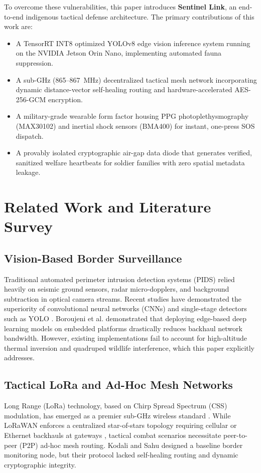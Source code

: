 \documentclass[conference]{IEEEtran}
\begin{document}
To overcome these vulnerabilities, this paper introduces \textbf{Sentinel Link}, an end-to-end indigenous tactical defense architecture. The primary contributions of this work are:
\begin{itemize}
    \item A TensorRT INT8 optimized YOLOv8 edge vision inference system running on the NVIDIA Jetson Orin Nano, implementing automated fauna suppression.
    \item A sub-GHz (865--867~MHz) decentralized tactical mesh network incorporating dynamic distance-vector self-healing routing and hardware-accelerated AES-256-GCM encryption.
    \item A military-grade wearable form factor housing PPG photoplethysmography (MAX30102) and inertial shock sensors (BMA400) for instant, one-press SOS dispatch.
    \item A provably isolated cryptographic air-gap data diode that generates verified, sanitized welfare heartbeats for soldier families with zero spatial metadata leakage.
\end{itemize}

\section{Related Work and Literature Survey}

\subsection{Vision-Based Border Surveillance}
Traditional automated perimeter intrusion detection systems (PIDS) relied heavily on seismic ground sensors, radar micro-dopplers, and background subtraction in optical camera streams. Recent studies have demonstrated the superiority of convolutional neural networks (CNNs) and single-stage detectors such as YOLO \cite{redmon2016yolo}. Boroujeni et al. \cite{boroujeni2021edge} demonstrated that deploying edge-based deep learning models on embedded platforms drastically reduces backhaul network bandwidth. However, existing implementations fail to account for high-altitude thermal inversion and quadruped wildlife interference, which this paper explicitly addresses.

\subsection{Tactical LoRa and Ad-Hoc Mesh Networks}
Long Range (LoRa) technology, based on Chirp Spread Spectrum (CSS) modulation, has emerged as a premier sub-GHz wireless standard \cite{augustin2016study, centenaro2016long}. While LoRaWAN enforces a centralized star-of-stars topology requiring cellular or Ethernet backhauls at gateways \cite{adelantado2017understanding}, tactical combat scenarios necessitate peer-to-peer (P2P) ad-hoc mesh routing. Kodali and Sahu \cite{kodali2019lora} designed a baseline border monitoring node, but their protocol lacked self-healing routing and dynamic cryptographic integrity.
\end{document}
